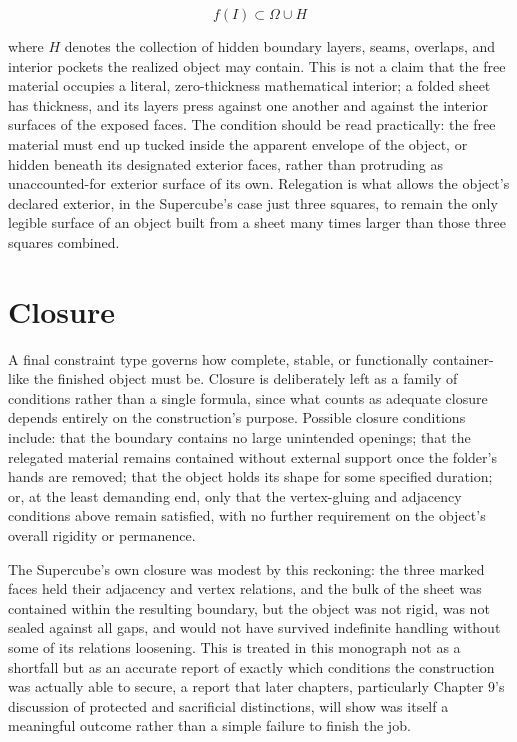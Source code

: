 \documentclass[11pt,oneside]{book}
\begin{document}
\[f(I) \subset \Omega \cup H\]

where \(H\) denotes the collection of hidden boundary layers, seams,
overlaps, and interior pockets the realized object may contain. This is
not a claim that the free material occupies a literal, zero-thickness
mathematical interior; a folded sheet has thickness, and its layers
press against one another and against the interior surfaces of the
exposed faces. The condition should be read practically: the free
material must end up tucked inside the apparent envelope of the object,
or hidden beneath its designated exterior faces, rather than protruding
as unaccounted-for exterior surface of its own. Relegation is what
allows the object's declared exterior, in the Supercube's case just
three squares, to remain the only legible surface of an object built
from a sheet many times larger than those three squares combined.

\hypertarget{closure}{%
\section{Closure}\label{closure}}

A final constraint type governs how complete, stable, or functionally
container-like the finished object must be. Closure is deliberately left
as a family of conditions rather than a single formula, since what
counts as adequate closure depends entirely on the construction's
purpose. Possible closure conditions include: that the boundary contains
no large unintended openings; that the relegated material remains
contained without external support once the folder's hands are removed;
that the object holds its shape for some specified duration; or, at the
least demanding end, only that the vertex-gluing and adjacency
conditions above remain satisfied, with no further requirement on the
object's overall rigidity or permanence.

The Supercube's own closure was modest by this reckoning: the three
marked faces held their adjacency and vertex relations, and the bulk of
the sheet was contained within the resulting boundary, but the object
was not rigid, was not sealed against all gaps, and would not have
survived indefinite handling without some of its relations loosening.
This is treated in this monograph not as a shortfall but as an accurate
report of exactly which conditions the construction was actually able to
secure, a report that later chapters, particularly Chapter 9's
discussion of protected and sacrificial distinctions, will show was
itself a meaningful outcome rather than a simple failure to finish the
job.
\end{document}
